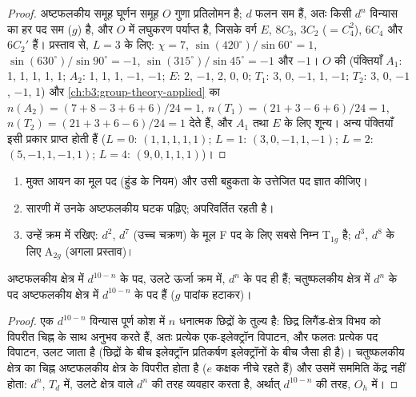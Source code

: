 \begin{proof}
अष्टफलकीय समूह घूर्णन समूह $O$ गुणा प्रतिलोमन है; $d$ फलन
सम हैं, अतः किसी $d^n$ विन्यास का हर पद सम ($g$) है, और
$O$ में लघुकरण पर्याप्त है, जिसके वर्ग $E$, $8C_3$, $3C_2$ ($=C_4^2$), $6C_4$ और $6C_2'$ हैं।
प्रस्ताव से, $L = 3$ के लिए: $\chi = 7$, $\sin(420^\circ)/\sin60^\circ = 1$, $\sin(630^\circ)/\sin90^\circ = -1$, $\sin(315^\circ)/\sin45^\circ = -1$
और $-1$। $O$ की  (पंक्तियाँ $A_1$: 1, 1, 1, 1, 1; $A_2$: 1, 1, 1, $-1$, $-1$; $E$: 2,
$-1$, 2, 0, 0; $T_1$: 3, 0, $-1$, 1, $-1$; $T_2$: 3, 0, $-1$, $-1$, 1) और
\cref{ch:b3:group-theory-applied} का  $n(A_2) = (7 + 8 - 3 + 6 + 6)/24 = 1$, $n(T_1) = (21 + 3 - 6 +
6)/24 = 1$, $n(T_2) = (21 + 3 + 6 - 6)/24 = 1$ देते हैं, और $A_1$ तथा $E$ के लिए शून्य। अन्य पंक्तियाँ
इसी प्रकार प्राप्त होती हैं ($L = 0$: $(1, 1, 1, 1, 1)$; $L = 1$: $(3, 0, -1, 1, -1)$; $L = 2$: $(5, -1, 1,
-1, 1)$; $L = 4$: $(9, 0, 1, 1, 1)$)।
\end{proof}

\begin{method}[किसी मुक्त-आयन पद का विपाटन]\label{met:b3:complex-spectra-magnetism:split-term}
\begin{enumerate}
  \item मुक्त आयन का मूल पद (हुंड के नियम) और उसी बहुकता के उत्तेजित
        पद ज्ञात कीजिए।
  \item सारणी में उनके अष्टफलकीय घटक पढ़िए; 
        अपरिवर्तित रहती है।
  \item उन्हें क्रम में रखिए: $d^2$, $d^7$ (उच्च चक्रण) के मूल F पद के लिए सबसे निम्न T$_{1g}$ है;
        $d^3$, $d^8$ के लिए A$_{2g}$ (अगला प्रस्ताव)।
\end{enumerate}
\end{method}

\begin{proposition}\label{prop:b3:complex-spectra-magnetism:hole}
अष्टफलकीय क्षेत्र में $d^{10-n}$ के पद, उलटे ऊर्जा
क्रम में, $d^n$ के पद ही हैं; चतुष्फलकीय क्षेत्र में $d^n$ के पद अष्टफलकीय
क्षेत्र में $d^{10-n}$ के पद हैं ($g$ पादांक हटाकर)।
\end{proposition}

\begin{proof}
एक $d^{10-n}$ विन्यास पूर्ण कोश में $n$ धनात्मक छिद्रों के तुल्य है:
छिद्र लिगैंड-क्षेत्र विभव को विपरीत चिह्न के साथ अनुभव करते हैं, अतः प्रत्येक
एक-इलेक्ट्रॉन विपाटन, और फलतः प्रत्येक पद विपाटन, उलट जाता है (छिद्रों के बीच
इलेक्ट्रॉन प्रतिकर्षण इलेक्ट्रॉनों के बीच जैसा ही है)। चतुष्फलकीय
क्षेत्र का चिह्न अष्टफलकीय क्षेत्र के विपरीत होता है ($e$ कक्षक
नीचे रहते हैं) और उसमें सममिति केंद्र नहीं होता: $d^n$, $T_d$ में, उलटे
क्षेत्र वाले $d^n$ की तरह व्यवहार करता है, अर्थात् $d^{10-n}$ की तरह, $O_h$ में।
\end{proof}

